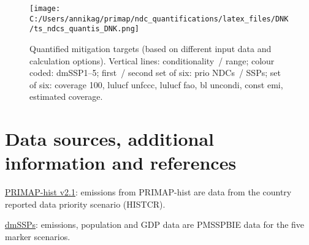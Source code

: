 \documentclass[12pt]{article}
\begin{document}
 \begin{figure}[H]
 \centering
 \texttt{[image: C:/Users/annikag/primap/ndc\_quantifications/latex\_files/DNK/ts\_ndcs\_quantis\_DNK.png]}
 \caption{Quantified mitigation targets (based on different input data and calculation options).
 Vertical lines: conditionality~/ range;
 colour coded: dmSSP1--5;
 first~/ second set of six: prio NDCs~/ SSPs;
 set of six: coverage 100, lulucf unfccc, lulucf fao, bl uncondi, const emi, estimated coverage.}
 \label{fig:miti}
 \end{figure}

 \newpage %
 \section{Data sources, additional information and references}
 \label{sec:dataSourcesRefs}

 \noindent \href{https://dataservices.gfz-potsdam.de/pik/showshort.php?id=escidoc:4736895}{PRIMAP-hist v2.1}: emissions from PRIMAP-hist are data from the country reported data priority scenario (HISTCR).

 \noindent \href{https://zenodo.org/record/3638137#.X2syXouxU2w}{dmSSPs}: emissions, population and GDP data are PMSSPBIE data for the five marker scenarios.
\end{document}
